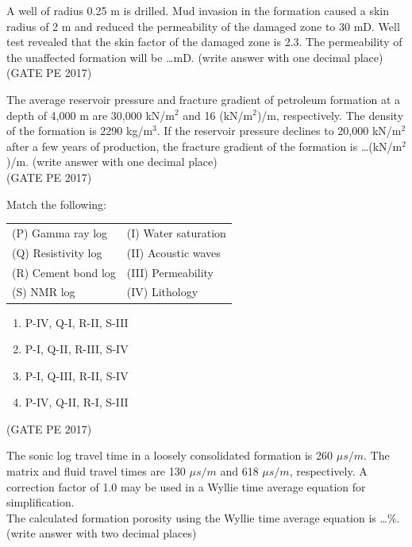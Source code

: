 \documentclass[journal,12pt,onecolumn]{IEEEtran}
\theoremstyle{remark}
\begin{document}
\begin{enumerate}
{\item A well of radius 0.25 m is drilled. Mud invasion in the formation caused a skin radius of 2 m and reduced the permeability of the damaged zone to 30 mD. Well test revealed that the skin factor of the damaged zone is 2.3.
The permeability of the unaffected formation will be \dots mD. (write answer with one decimal place)\\

\hfill{(GATE PE 2017)}

\item The average reservoir pressure and fracture gradient of petroleum formation at a depth of 4,000 m are 30,000 kN/m$^2$ and 16 (kN/m$^2$)/m, respectively.
The density of the formation is 2290 kg/m$^3$. If the reservoir pressure declines to 20,000 kN/m$^2$ after a few years of production, the fracture gradient of the formation is \dots(kN/m$^2$)/m. (write answer with one decimal place)\\

\hfill{(GATE PE 2017)}

\item Match the following:\\

\begin{tabular}{ll}
(P) Gamma ray log & (I) Water saturation \\
(Q) Resistivity log & (II) Acoustic waves \\
(R) Cement bond log & (III) Permeability \\
(S) NMR log & (IV) Lithology \\
\end{tabular}
\begin{enumerate}
\item P-IV, Q-I, R-II, S-III \\
\item P-I, Q-II, R-III, S-IV \\
\item P-I, Q-III, R-II, S-IV \\
\item P-IV, Q-II, R-I, S-III
\end{enumerate}
\hfill{(GATE PE 2017)}

\item The sonic log travel time in a loosely consolidated formation is 260 $\mu s/m$. The matrix and fluid travel times are 130 $\mu s/m$ and 618 $\mu s/m$, respectively. A correction factor of 1.0 may be used in a Wyllie time average equation for simplification.\\[1ex]
The calculated formation porosity using the Wyllie time average equation is \dots \%. (write answer with two decimal places)\\

}
\end{enumerate}
\end{document}
